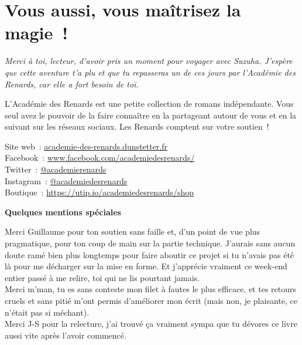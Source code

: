 \chapter*{Vous aussi, vous maîtrisez la magie~!}

\textit{Merci à toi, lecteur, d'avoir pris un moment pour voyager avec Suzuha. J'espère que cette aventure t'a plu et que tu repasseras un de ces jours par l'Académie des Renards, car elle a fort besoin de toi.} 

\parbr

L'Académie des Renards est une petite collection de romans indépendante. Vous seul avez le pouvoir de la faire connaître en la partageant autour de vous et en la suivant sur les réseaux sociaux. Les Renards comptent sur votre soutien~!

\parbr

Site web~: \href{http://academie-des-renards.dunstetter.fr}{academie-des-renards.dunstetter.fr} \\

Facebook~: \href{https://www.facebook.com/academiedesrenards/}{www.facebook.com/academiedesrenards/} \\

Twitter~: \href{https://twitter.com/academierenards}{@academierenards} \\

Instagram~:  \href{https://www.instagram.com/academiedesrenards/}{@academiedesrenards} \\

Boutique~: \href{https://utip.io/academiedesrenards/shop}{https://utip.io/academiedesrenards/shop}

\newpage

\textbf{Quelques mentions spéciales}

\parbr

Merci Guillaume pour ton soutien sans faille et, d'un point de vue plus pragmatique, pour ton coup de main sur la partie technique. J'aurais sans aucun doute ramé bien plus longtemps pour faire aboutir ce projet si tu n'avais pas été là pour me décharger sur la mise en forme. Et j'apprécie vraiment ce week-end entier passé à me relire, toi qui ne lis pourtant jamais. \\

Merci m'man, tu es sans conteste mon filet à fautes le plus efficace, et tes retours cruels et sans pitié m'ont permis d'améliorer mon écrit (mais non, je plaisante, ce n'était pas si méchant). \\

Merci J-S pour la relecture, j'ai trouvé ça vraiment sympa que tu dévores ce livre aussi vite après l'avoir commencé.



